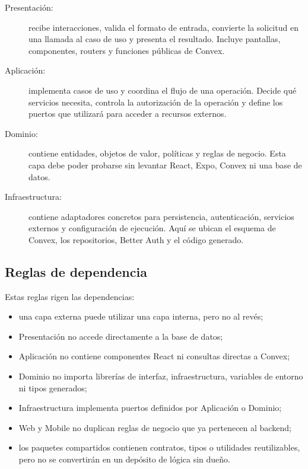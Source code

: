 \documentclass[11pt,a4paper]{article}
\begin{document}
\begin{description}
  \item[Presentación:] recibe interacciones, valida el formato de entrada,
    convierte la solicitud en una llamada al caso de uso y presenta el
    resultado. Incluye pantallas, componentes, routers y funciones públicas de
    Convex.
  \item[Aplicación:] implementa casos de uso y coordina el flujo de una
    operación. Decide qué servicios necesita, controla la autorización de la
    operación y define los puertos que utilizará para acceder a recursos
    externos.
  \item[Dominio:] contiene entidades, objetos de valor, políticas y reglas de
    negocio. Esta capa debe poder probarse sin levantar React, Expo, Convex ni
    una base de datos.
  \item[Infraestructura:] contiene adaptadores concretos para persistencia,
    autenticación, servicios externos y configuración de ejecución. Aquí se
    ubican el esquema de Convex, los repositorios, Better Auth y el código
    generado.
\end{description}

\subsection{Reglas de dependencia}

Estas reglas rigen las dependencias:

\begin{itemize}
  \item una capa externa puede utilizar una capa interna, pero no al revés;
  \item Presentación no accede directamente a la base de datos;
  \item Aplicación no contiene componentes React ni consultas directas a
    Convex;
  \item Dominio no importa librerías de interfaz, infraestructura, variables
    de entorno ni tipos generados;
  \item Infraestructura implementa puertos definidos por Aplicación o Dominio;
  \item Web y Mobile no duplican reglas de negocio que ya pertenecen al
    backend;
  \item los paquetes compartidos contienen contratos, tipos o utilidades
    reutilizables, pero no se convertirán en un depósito de lógica sin dueño.
\end{itemize}
\end{document}
